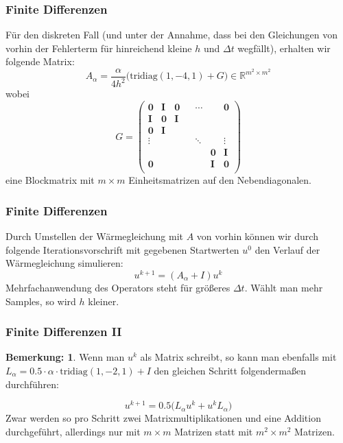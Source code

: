 \documentclass[xcolor = dvipsnames, notheorems, 10pt]{beamer}
\newcommand{\vth}{\vspace{4pt}}
\theoremstyle{definition}
\newtheorem{remark}		{Bemerkung:\vth}
\begin{document}
\begin{frame}
\frametitle{Finite Differenzen}
	Für den diskreten Fall (und unter der Annahme, dass bei den Gleichungen von vorhin der Fehlerterm für hinreichend kleine $h$ und $\Delta t$ wegfällt), erhalten wir folgende Matrix:
	$$
		A_\alpha = \frac{\alpha}{4h^2}\bigg(\text{tridiag}(1,-4,1) + G \bigg) \in \mathbb{R}^{m^2 \times m^2}
	$$
	wobei
	$$
	G =\begin{pmatrix}
			\mathbf{0} 	& \mathbf{I} 	& \mathbf{0} 	& 				& \cdots 		&				& \mathbf{0} 	\\
			\mathbf{I}	& \mathbf{0} 	& \mathbf{I} 	& 				&				& 				&			 	\\
			\mathbf{0}	& \mathbf{I}	&				& 				& 				&				&				\\
			\vdots		&				&				& 				& \ddots		&				& \vdots		\\
						&				&				&				&				& \mathbf{0}	& \mathbf{I}	\\
			\mathbf{0}	&				&				&				&				& \mathbf{I}	& \mathbf{0}	\\
		\end{pmatrix}
	$$
	eine Blockmatrix mit $m \times m$ Einheitsmatrizen auf den Nebendiagonalen.
\end{frame}


\begin{frame}
\frametitle{Finite Differenzen}
	Durch Umstellen der Wärmegleichung mit $A$ von vorhin können wir durch folgende Iterationsvorschrift mit gegebenen Startwerten $u^0$ den Verlauf der Wärmegleichung simulieren:
	$$u^{k+1} = (A_\alpha +I)u^k$$
	Mehrfachanwendung des Operators steht für größeres $\Delta t$. Wählt man mehr Samples, so wird $h$ kleiner.
\end{frame}

\begin{frame}
\frametitle{Finite Differenzen II}
	\begin{remark}
		Wenn man $u^k$ als Matrix schreibt, so kann man ebenfalls mit $L_\alpha = 0.5 \cdot \alpha \cdot \text{tridiag}(1,-2,1) + I$ den gleichen Schritt folgendermaßen durchführen:

		$$u^{k+1} = 0.5 \big( L_\alpha u^k + u^kL_\alpha \big)$$
		Zwar werden so pro Schritt zwei Matrixmultiplikationen und eine Addition durchgeführt, allerdings nur mit $m \times m$ Matrizen statt mit $m^2 \times m^2$ Matrizen.
	\end{remark}
\end{frame}
\end{document}
